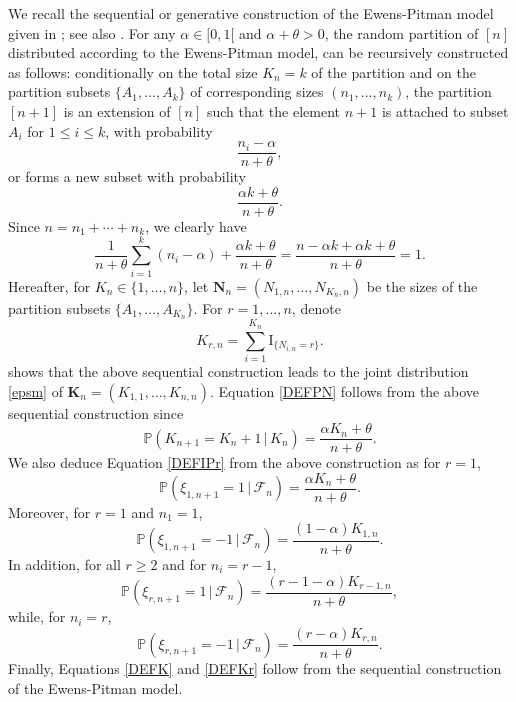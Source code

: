 \documentclass[twoside,12pt]{article}
\newcommand{\dP}{\mathbb{P}}
\newcommand{\rI}{\mathrm{I}}
\begin{document}
We recall the sequential or generative construction of the Ewens-Pitman model given in \citet[Proposition 9]{Pit(95)}; see also \citet[Chapter 3]{Pit(06)}. For any $\alpha\in[0,1[$ and  $\alpha+\theta>0$, the random partition of $[n]$ distributed according to the Ewens-Pitman model, can be recursively constructed as follows: 
conditionally on the total size $K_n=k$ of the partition and on the partition subsets $\{A_1, \ldots ,A_k \}$ of corresponding sizes $(n_1, \ldots,n_k)$, the partition $[n+1]$ is an extension of $[n]$ such that the element $n+1$ is attached to subset $A_i$ for $1 \leq i \leq k$, with probability
$$
\frac{n_i- \alpha}{n+ \theta},
$$
or forms a new subset with probability
$$
\frac{\alpha k + \theta}{n+ \theta}.
$$ 
Since $n=n_1+ \cdots+n_k$, we clearly have
\begin{equation*}
    \frac{1}{n+\theta}\sum_{i=1}^{k} (n_i - \alpha) + \frac{ \alpha k + \theta}{n+\theta}= \frac{n-\alpha k + \alpha k + \theta}{n+ \theta}=1.
\end{equation*}
Hereafter, for $K_{n}\in\{1,\ldots,n\}$, let $\mathbf{N}_{n}=(N_{1,n},\ldots,N_{K_{n},n})$ be the sizes of 
the partition subsets $\{A_1, \ldots,A_{K_n}\}$. For $r=1,\ldots,n$, denote 
$$K_{r,n}=\sum_{i=1}^{K_{n}}\rI_{\{N_{i,n}=r\}}.$$ 
\citet[Proposition 9]{Pit(95)} shows that the above sequential construction leads to the joint distribution \eqref{epsm} of $\mathbf{K}_{n}=(K_{1,1},\ldots,K_{n,n})$. Equation \eqref{DEFPN} follows from the above sequential construction since
\begin{displaymath}
\mathbb{P}(K_{n+1}=K_{n}+1\,|\,K_{n})=\frac{\alpha K_{n}+ \theta}{n+\theta}.
\end{displaymath}
We also deduce Equation \eqref{DEFIPr} from the above construction
as for $r=1$,
\begin{displaymath}
\dP(\xi_{1,n+1}=1\,|\,\mathcal{F}_{n})=\frac{\alpha K_{n}+ \theta}{n+\theta}.
\end{displaymath}
Moreover, for $r=1$ and $n_1=1$,
\begin{displaymath}
 \dP(\xi_{1,n+1}=-1\,|\,\mathcal{F}_{n})=\frac{(1-\alpha)K_{1,n}}{n+\theta}.
\end{displaymath}
In addition, for all $r \geq 2$ and for $n_i=r-1$,
\begin{displaymath}
\dP(\xi_{r,n+1}=1\,|\,\mathcal{F}_{n})=\frac{(r-1-\alpha)K_{r-1,n}}{n+\theta},
\end{displaymath}
while, for $n_i=r$,
\begin{displaymath}
\dP(\xi_{r,n+1}=-1\,|\,\mathcal{F}_{n})=\frac{(r-\alpha)K_{r,n}}{n+\theta}.
\end{displaymath}
Finally, Equations \eqref{DEFK} and \eqref{DEFKr} follow from the sequential construction of the Ewens-Pitman model.
\end{document}
